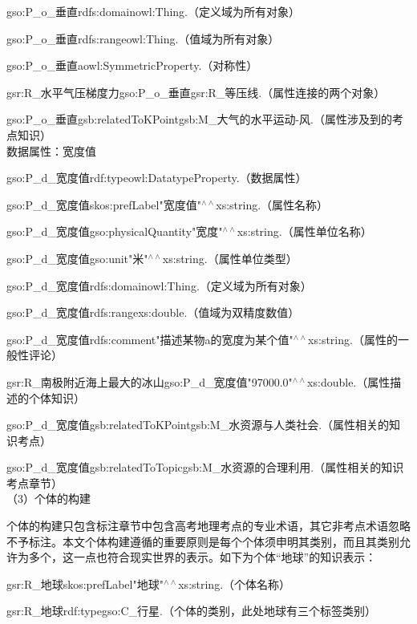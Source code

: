 gso:P\_o\_垂直\quad rdfs:domain\quad owl:Thing\quad .\quad （定义域为所有对象）

gso:P\_o\_垂直\quad rdfs:range\quad owl:Thing\quad .\quad （值域为所有对象）

gso:P\_o\_垂直\quad a\quad owl:SymmetricProperty\quad .\quad \quad （对称性）

gsr:R\_水平气压梯度力\quad gso:P\_o\_垂直\quad gsr:R\_等压线\quad .（属性连接的两个对象）

gso:P\_o\_垂直\quad gsb:relatedToKPoint\quad gsb:M\_大气的水平运动-风\quad .（属性涉及到的考点知识）\\

数据属性：宽度值

gso:P\_d\_宽度值\quad rdf:type\quad owl:DatatypeProperty\quad .（数据属性）

gso:P\_d\_宽度值\quad skos:prefLabel\quad "宽度值"$^{\land\land}$xs:string\quad .（属性名称）

gso:P\_d\_宽度值\quad gso:physicalQuantity\quad "宽度"$^{\land\land}$xs:string\quad .（属性单位名称）

gso:P\_d\_宽度值\quad gso:unit\quad "米"$^{\land\land}$xs:string\quad .（属性单位类型）

gso:P\_d\_宽度值\quad rdfs:domain\quad owl:Thing\quad .（定义域为所有对象）

gso:P\_d\_宽度值\quad rdfs:range\quad xs:double\quad .（值域为双精度数值）

gso:P\_d\_宽度值\quad rdfs:comment\quad "描述某物a的宽度为某个值"$^{\land\land}$xs:string\quad .（属性的一般性评论）

gsr:R\_南极附近海上最大的冰山\quad gso:P\_d\_宽度值\quad \quad "97000.0"$^{\land\land}$xs:double\quad .（属性描述的个体知识）

gso:P\_d\_宽度值\quad gsb:relatedToKPoint\quad gsb:M\_水资源与人类社会\quad .（属性相关的知识考点）

gso:P\_d\_宽度值\quad gsb:relatedToTopic\quad gsb:M\_水资源的合理利用\quad .（属性相关的知识考点章节）  \\

（3）个体的构建

个体的构建只包含标注章节中包含高考地理考点的专业术语，其它非考点术语忽略不予标注。本文个体构建遵循的重要原则是每个个体须申明其类别，而且其类别允许为多个，这一点也符合现实世界的表示。如下为个体“地球”的知识表示：

gsr:R\_地球\quad skos:prefLabel\quad "地球"$^{\land\land}$xs:string\quad .\quad （个体名称）

gsr:R\_地球\quad rdf:type\quad gso:C\_行星\quad .（个体的类别，此处地球有三个标签类别）

